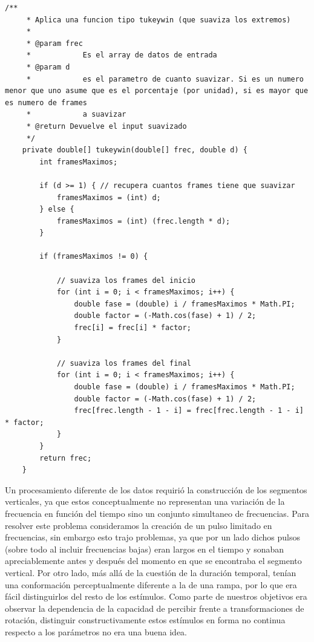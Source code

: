 \documentclass{article}
\begin{document}
	\begin{minipage}{\textwidth}
    \begin{lstlisting}[caption=Código que aplica el filtro tipo Tukey (ver figura \ref{fig:tukey}) para evitar la inclusión de armónicos por el efecto de los contornos., label=code:tukey]
     /**
	 * Aplica una funcion tipo tukeywin (que suaviza los extremos)
	 * 
	 * @param frec
	 *            Es el array de datos de entrada
	 * @param d
	 *            es el parametro de cuanto suavizar. Si es un numero menor que uno asume que es el porcentaje (por unidad), si es mayor que es numero de frames
	 *            a suavizar
	 * @return Devuelve el input suavizado
	 */
	private double[] tukeywin(double[] frec, double d) {
		int framesMaximos;

		if (d >= 1) { // recupera cuantos frames tiene que suavizar
			framesMaximos = (int) d;
		} else {
			framesMaximos = (int) (frec.length * d);
		}

		if (framesMaximos != 0) {

			// suaviza los frames del inicio
			for (int i = 0; i < framesMaximos; i++) {
				double fase = (double) i / framesMaximos * Math.PI;
				double factor = (-Math.cos(fase) + 1) / 2;
				frec[i] = frec[i] * factor;
			}

			// suaviza los frames del final
			for (int i = 0; i < framesMaximos; i++) {
				double fase = (double) i / framesMaximos * Math.PI;
				double factor = (-Math.cos(fase) + 1) / 2;
				frec[frec.length - 1 - i] = frec[frec.length - 1 - i] * factor;
			}
		}
		return frec;
	}
	\end{lstlisting}
	\end{minipage}
    
    Un procesamiento diferente de los datos requirió la construcción de los segmentos verticales, ya que estos conceptualmente no representan una variación de la frecuencia en función del tiempo sino un conjunto simultaneo de frecuencias. Para resolver este problema consideramos la creación de un pulso limitado en frecuencias, sin embargo esto trajo problemas, ya que por un lado dichos pulsos (sobre todo al incluir frecuencias bajas) eran largos en el tiempo y sonaban apreciablemente antes y después del momento en que se encontraba el segmento vertical. Por otro lado, más allá de la cuestión de la duración temporal, tenían una conformación perceptualmente diferente a la de una rampa, por lo que era fácil distinguirlos del resto de los estímulos. Como parte de nuestros objetivos era observar la dependencia de la capacidad de percibir frente a transformaciones de rotación, distinguir constructivamente estos estímulos en forma no continua respecto a los parámetros no era una buena idea. 
    
\end{document}
